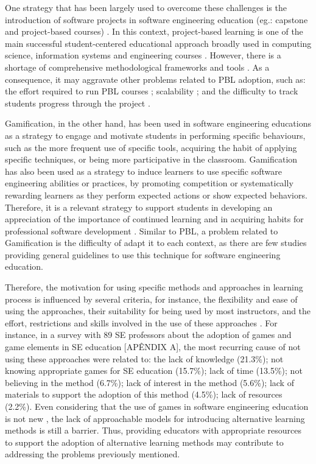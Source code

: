 One strategy that has been largely used to overcome these challenges is the introduction of software projects in software engineering education (eg.: capstone and project-based courses) \citep{delgado:2017, marques:2017}. In this context, project-based learning is one of the main successful student-centered educational approach broadly used in computing science, information systems and engineering courses \citep{delgado:2017, marques:2017, Macias:2012, Jazayeri:2015, Shuto:2016, Warin:2016, Yamada:2014}. However, there is a shortage of comprehensive methodological frameworks and tools \citep{Warin:2016, Macias:2012}. As a consequence, it may aggravate other problems related to PBL adoption, such as: the effort required to run PBL courses \citep{Harms:2016, Hanakawa:2015, Nguyen:2013, marques:2017, Rupakheti:2017, Daun:2016, Gary:2015, Makio:2017}; scalability \citep{Harms:2016, Gary:2015}; and the difficulty to track students progress through the project \citep{Fukuyasu:2013, Harms:2016}.

Gamification, in the other hand, has been used in software engineering educations as a strategy to engage and motivate students in performing specific behaviours, such as the more frequent use of specific tools, acquiring the habit of applying specific techniques, or being more participative in the classroom. Gamification has also been used as a strategy to induce learners to use specific software engineering abilities or practices, by promoting competition or systematically rewarding learners as they perform expected actions or show expected behaviors. Therefore, it is a relevant strategy to support students in developing an appreciation of the importance of continued learning and in acquiring habits for professional software development \citep{Souza:2018}. Similar to PBL, a problem related to Gamification is the difficulty of adapt it to each context, as there are few studies providing general guidelines to use this technique for software engineering education.

Therefore, the motivation for using specific methods and approaches in learning process is influenced by  several  criteria,  for  instance, the flexibility and ease of using the approaches, their  suitability  for  being  used  by  most  instructors,  and  the  effort,   restrictions  and  skills  involved  in  the  use  of  these  approaches \citep{Marques:2014}. For instance, in a survey with 89 SE professors about the adoption of games and game elements in SE education [APÊNDIX A], the most recurring cause of not using these approaches were related to: the lack of knowledge (21.3\%); not knowing appropriate games for SE education (15.7\%); lack of time (13.5\%); not believing in the method (6.7\%); lack of interest in the method (5.6\%); lack of materials to support the adoption of this method (4.5\%); lack of resources (2.2\%). Even considering that the use of games in software engineering education is not new \citep{Souza:2018}, the lack of approachable models for introducing alternative learning methods is still a barrier. Thus, providing educators with appropriate resources to support the adoption of alternative learning methods may contribute to addressing the problems previously mentioned.

